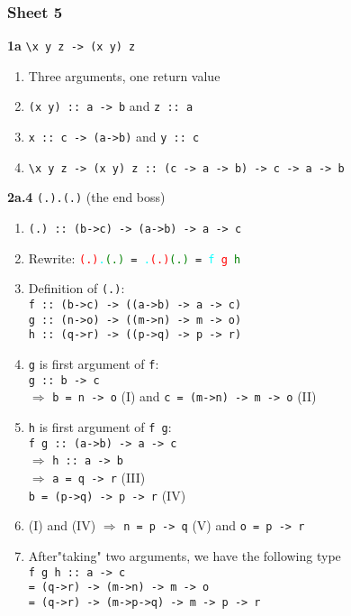 \documentclass[11.5pt]{article}
\begin{document}
\subsubsection{Sheet 5}
\textbf{1a} \verb|\x y z -> (x y) z|
\begin{enumerate}
    \item Three arguments, one return value
    \item \verb|(x y) :: a -> b| and \verb|z :: a|
    \item \verb|x :: c -> (a->b)| and \verb|y :: c|
    \item \verb|\x y z -> (x y) z :: (c -> a -> b) -> c -> a -> b|
\end{enumerate}
\textbf{2a.4} \texttt{(.).(.)} (the end boss)
\begin{enumerate}
    \item \texttt{(.) :: (b->c) -> (a->b) -> a -> c}
    \item Rewrite: \texttt{\textcolor{Red}{(.)}\textcolor{Cyan}{.}\textcolor{Green}{(.)} 
    = \textcolor{Cyan}{.}\textcolor{Red}{(.)}\textcolor{Green}{(.)} 
    = \textcolor{Cyan}{f} \textcolor{Red}{g} \textcolor{Green}{h}}
    \item Definition of \texttt{(.)}: \\
    \texttt{f :: (b->c) -> ((a->b) -> a -> c)} \\
    \texttt{g :: (n->o) -> ((m->n) -> m -> o)} \\
    \texttt{h :: (q->r) -> ((p->q) -> p -> r)} 
    \item \texttt{g} is first argument of \texttt{f}: \\
    \texttt{g :: b -> c} \\
    $\Rightarrow$ \texttt{b = n -> o} (I) and
    \texttt{c = (m->n) -> m -> o} (II)
    \item \texttt{h} is first argument of \texttt{f g}:\\
    \texttt{f g :: (a->b) -> a -> c}   \\
    $\Rightarrow$ \texttt{h :: a -> b}  \\
    $\Rightarrow$ \texttt{a = q -> r} (III)\\
    \texttt{b = (p->q) -> p -> r} (IV)
    \item (I) and (IV) $\Rightarrow$ 
    \texttt{n = p -> q} (V) and \texttt{o = p -> r}
    \item After"taking" two arguments, we have the following type \\
    \texttt{f g h :: a -> c} \\
    \texttt{= (q->r) -> (m->n) -> m -> o} \\
    \texttt{= (q->r) -> (m->p->q) -> m -> p -> r }
\end{enumerate}
\end{document}
